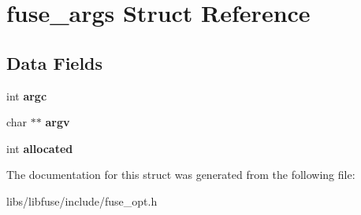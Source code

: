 \hypertarget{structfuse__args}{}\section{fuse\+\_\+args Struct Reference}
\label{structfuse__args}
\subsection*{Data Fields}
\begin{DoxyCompactItemize}
\item 
int {\bfseries argc}\hypertarget{structfuse__args_a501883d1eababa08e05b0c802b31e11d}{}\label{structfuse__args_a501883d1eababa08e05b0c802b31e11d}

\item 
char $\ast$$\ast$ {\bfseries argv}\hypertarget{structfuse__args_a6f90bec2356aff03de79baaca65276b6}{}\label{structfuse__args_a6f90bec2356aff03de79baaca65276b6}

\item 
int {\bfseries allocated}\hypertarget{structfuse__args_a3fdc7eb5448d89a4ecbabba88cbafe5f}{}\label{structfuse__args_a3fdc7eb5448d89a4ecbabba88cbafe5f}

\end{DoxyCompactItemize}


The documentation for this struct was generated from the following file\+:\begin{DoxyCompactItemize}
\item 
libs/libfuse/include/fuse\+\_\+opt.\+h\end{DoxyCompactItemize}
